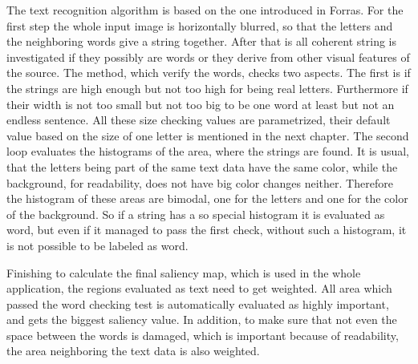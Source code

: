 \documentclass[draft,final]{vutinfth} %
\begin{document}
	The text recognition algorithm is based on the one introduced in Forras.
	For the first step the whole input image is horizontally blurred, so that the letters and the neighboring words give a string together.
	After that is all coherent string is investigated if they possibly are words or they derive from other visual features of the source.
	The method, which verify the words, checks two aspects.
	The first is if the strings are high enough but not too high for being real letters.
	Furthermore if their width is not too small but not too big to be one word at least but not an endless sentence.
	All these size checking values are parametrized, their default value based on the size of one letter is mentioned in the next chapter. 
	The second loop evaluates the histograms of the area, where the strings are found.
	It is usual, that the letters being part of the same text data have the same color, while the background, for readability, does not have big color changes neither.
	Therefore the histogram of these areas are bimodal, one for the letters and one for the color of the background.
	So if a string has a so special histogram it is evaluated as word, but even if it managed to pass the first check, without such a histogram, it is not possible to be labeled as word. \par 
	Finishing to calculate the final saliency map, which is used in the whole application, the regions evaluated as text need to get weighted.
	All area which passed the word checking test is automatically evaluated as highly important, and gets the biggest saliency value.
	In addition, to make sure that not even the space between the words is damaged, which is important because of readability, the area neighboring the text data is also weighted.
	
\end{document}
